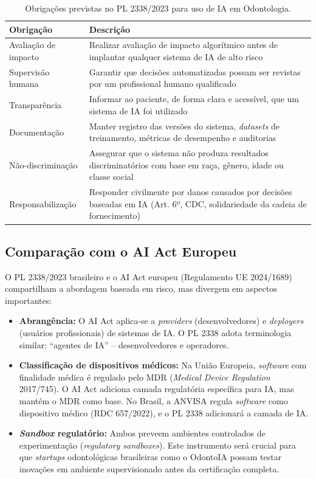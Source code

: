 \begin{table}[H]
  \centering
  \caption{Obrigações previstas no PL 2338/2023 para uso de IA em Odontologia.}
  \label{tab:pl2338-obrigacoes}
  \begin{tabularx}{\textwidth}{lX}
    \toprule
    \textbf{Obrigação} & \textbf{Descrição} \\
    \midrule
    Avaliação de impacto & Realizar avaliação de impacto algorítmico antes de
      implantar qualquer sistema de IA de alto risco \\
    Supervisão humana & Garantir que decisões automatizadas possam ser revistas
      por um profissional humano qualificado \\
    Transparência & Informar ao paciente, de forma clara e acessível, que um
      sistema de IA foi utilizado \\
    Documentação & Manter registro das versões do sistema, \textit{datasets} de
      treinamento, métricas de desempenho e auditorias \\
    Não-discriminação & Assegurar que o sistema não produza resultados
      discriminatórios com base em raça, gênero, idade ou classe social \\
    Responsabilização & Responder civilmente por danos causados por decisões
      baseadas em IA (Art. 6º, CDC, solidariedade da cadeia de fornecimento) \\
    \bottomrule
  \end{tabularx}
\end{table}

\subsection{Comparação com o AI Act Europeu}

O PL 2338/2023 brasileiro e o AI Act europeu (Regulamento UE 2024/1689)
compartilham a abordagem baseada em risco, mas divergem em aspectos importantes:

\begin{itemize}
  \item \textbf{Abrangência:} O AI Act aplica-se a \textit{providers}
    (desenvolvedores) e \textit{deployers} (usuários profissionais) de sistemas
    de IA. O PL 2338 adota terminologia similar: ``agentes de IA'' --
    desenvolvedores e operadores.

  \item \textbf{Classificação de dispositivos médicos:} Na União Europeia,
    \textit{software} com finalidade médica é regulado pelo MDR (\textit{Medical
    Device Regulation} 2017/745). O AI Act adiciona camada regulatória
    específica para IA, mas mantém o MDR como base. No Brasil, a ANVISA regula
    \textit{software} como dispositivo médico (RDC 657/2022), e o PL 2338
    adicionará a camada de IA.

  \item \textbf{\textit{Sandbox} regulatório:} Ambos preveem ambientes
    controlados de experimentação (\textit{regulatory sandboxes}). Este
    instrumento será crucial para que \textit{startups} odontológicas
    brasileiras como o OdontoIA possam testar inovações em ambiente
    supervisionado antes da certificação completa.
\end{itemize}

